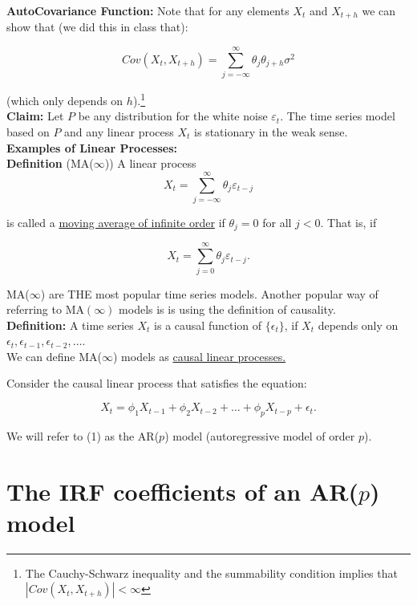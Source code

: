 \documentclass[12] {article}
\begin{document}
\noindent \textbf{AutoCovariance Function:} Note that for any elements $X_t$ and $X_{t+h}$ we can show that (we did this in class that):

\[ Cov(X_t, X_{t+h})  = \sum_{j=-\infty}^{\infty} \theta_j \theta_{j+h} \sigma^2  \]

\noindent (which only depends on $h$).\footnote{The Cauchy-Schwarz inequality and the summability condition implies that $|Cov(X_t, X_{t+h})| < \infty$} \\


\textbf{Claim:} Let $P$ be any distribution for the white noise $\varepsilon_{t}$. The time series model based on $P$ and any linear process $X_t$ is stationary in the weak sense. \\



\noindent \textbf{Examples of Linear Processes:} \\

\noindent \textbf{Definition} (MA($\infty$)) A linear process 
\[ X_t = \sum_{j=-\infty}^{\infty} \theta_j \varepsilon_{t-j} \] 

\noindent is called a \underline{moving average of infinite order} if $\theta_j=0$ for all $j<0$. That is, if 

\[ X_t = \sum_{j=0}^{\infty} \theta_j \varepsilon_{t-j}.\]

\noindent MA($\infty$) are THE most popular time series models. Another popular way of referring to MA$(\infty)$ models is is using the definition of causality. \\

\noindent \textbf{Definition:} A time series $X_t$ is a causal function of $\{\epsilon_t\}$, if $X_t$ depends only on $\epsilon_t, \epsilon_{t-1}, \epsilon_{t-2}, \ldots$.\\

\noindent We can define MA($\infty$) models as \underline{causal linear processes.}  \\
 
 \newpage
 
 Consider the causal linear process that satisfies the equation:

\begin{equation}
X_t = \phi_1 X_{t-1} + \phi_2 X_{t-2} + \ldots + \phi_p X_{t-p} + \epsilon_{t}. 
\end{equation}

\noindent We will refer to (1) as the AR($p$) model (autoregressive model of order $p$). 

\section{The IRF coefficients of an AR($p$) model}
\end{document}
